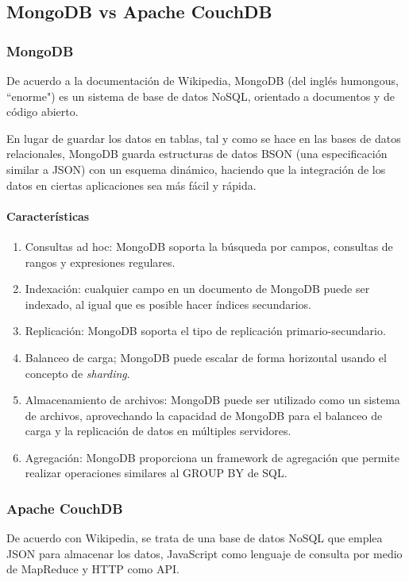 \subsection{MongoDB vs Apache CouchDB}
\subsubsection*{MongoDB}
De acuerdo a la documentación de Wikipedia\cite{wikipedia_mongodb_2020}, MongoDB (del inglés humongous, ``enorme") es un sistema de base de datos NoSQL, orientado a documentos y de código abierto.


En lugar de guardar los datos en tablas, tal y como se hace en las bases de datos relacionales, MongoDB guarda estructuras de datos BSON (una especificación similar a JSON) con un esquema dinámico, haciendo que la integración de los datos en ciertas aplicaciones sea más fácil y rápida.

\paragraph*{Características}
\begin{enumerate}
    \item Consultas ad hoc: MongoDB soporta la búsqueda por campos, consultas de rangos y expresiones regulares.
    \item Indexación: cualquier campo en un documento de MongoDB puede ser indexado, al igual que es posible hacer índices secundarios. 
    \item Replicación: MongoDB soporta el tipo de replicación primario-secundario. 
    \item Balanceo de carga; MongoDB puede escalar de forma horizontal usando el concepto de \textit{sharding}.
    \item Almacenamiento de archivos: MongoDB puede ser utilizado como un sistema de archivos, aprovechando la capacidad de MongoDB para el balanceo de carga y la replicación de datos en múltiples servidores. 
    \item Agregación: MongoDB proporciona un framework de agregación que permite realizar operaciones similares al GROUP BY de SQL.
\end{enumerate}


\subsubsection*{Apache CouchDB}


De acuerdo con Wikipedia\cite{wikipedia_couchdb_2020},  se trata de una base de datos NoSQL que emplea JSON para almacenar los datos, JavaScript como lenguaje de consulta por medio de MapReduce y HTTP como API.


